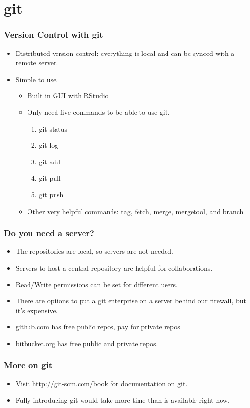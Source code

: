 \documentclass[t]{beamer}\usepackage[]{graphicx}\usepackage[]{color}
\begin{document}
\section{git}
\begin{frame}[fragile]
  \frametitle{Version Control with git}
  \begin{itemize}
    \item Distributed version control: everything is local and can be synced
      with a remote server.
    \item Simple to use.  
      \begin{itemize}
        \item Built in GUI with RStudio
        \item Only need five commands to be able to use git.
          \begin{enumerate}
            \item git status
            \item git log
            \item git add
            \item git pull
            \item git push
          \end{enumerate}
        \item Other very helpful commands: tag, fetch, merge, mergetool, and
          branch
      \end{itemize}
  \end{itemize}
\end{frame}

\begin{frame}
  \frametitle{Do you need a server?}
  \begin{itemize}
    \item The repositories are local, so servers are not needed.
    \item Servers to host a central repository are helpful for collaborations.
    \item Read/Write permissions can be set for different users.
    \item There are options to put a git enterprise on a server behind our
      firewall, but it's expensive.
    \item github.com has free public repos, pay for private repos
    \item bitbucket.org has free public and private repos.
  \end{itemize}
\end{frame}

\begin{frame}
  \frametitle{More on git}
  \begin{itemize}
    \item Visit \url{http://git-scm.com/book} for documentation on git.
    \item Fully introducing git would take more time than is available right
      now.
  \end{itemize}
\end{frame}

\end{document}

